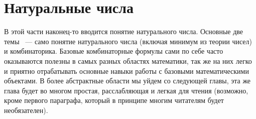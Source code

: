 \documentclass[a5paper,10pt,pagesize,DIV=classic]{scrbook}
\theoremstyle{plain}
\theoremstyle{definition}
\begin{document}









\chapter{Натуральные числа}
В этой части наконец-то вводится понятие натурального числа. Основные две темы ~--- само понятие натурального числа (включая минимум из теории чисел) и комбинаторика. Базовые комбинаторные формулы сами по себе часто оказываются полезны в самых разных областях математики, так же на них легко и приятно отрабатывать основные навыки работы с базовыми математическими объектами. В более абстрактные области мы уйдем со следующей главы, эта же глава будет во многом простая, расслабляющая и легкая для чтения (возможно, кроме первого параграфа, который в принципе многим читателям будет необязателен).






\end{document}
